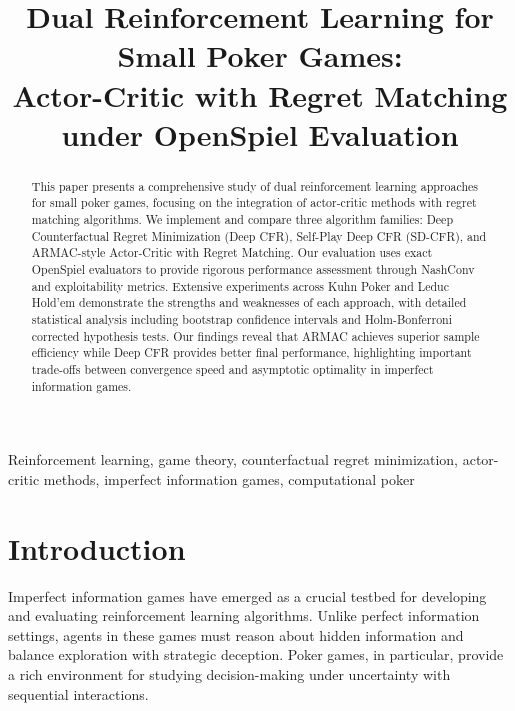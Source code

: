\documentclass[10pt,twocolumn,conference]{IEEEtran}
\begin{document}
\title{Dual Reinforcement Learning for Small Poker Games: \\
Actor-Critic with Regret Matching under OpenSpiel Evaluation}

\author{
}

\maketitle

\begin{abstract}
This paper presents a comprehensive study of dual reinforcement learning approaches for small poker games, focusing on the integration of actor-critic methods with regret matching algorithms. We implement and compare three algorithm families: Deep Counterfactual Regret Minimization (Deep CFR), Self-Play Deep CFR (SD-CFR), and ARMAC-style Actor-Critic with Regret Matching. Our evaluation uses exact OpenSpiel evaluators to provide rigorous performance assessment through NashConv and exploitability metrics. Extensive experiments across Kuhn Poker and Leduc Hold'em demonstrate the strengths and weaknesses of each approach, with detailed statistical analysis including bootstrap confidence intervals and Holm-Bonferroni corrected hypothesis tests. Our findings reveal that ARMAC achieves superior sample efficiency while Deep CFR provides better final performance, highlighting important trade-offs between convergence speed and asymptotic optimality in imperfect information games.
\end{abstract}

\begin{IEEEkeywords}
Reinforcement learning, game theory, counterfactual regret minimization, actor-critic methods, imperfect information games, computational poker
\end{IEEEkeywords}

\section{Introduction}
\label{sec:introduction}

Imperfect information games have emerged as a crucial testbed for developing and evaluating reinforcement learning algorithms. Unlike perfect information settings, agents in these games must reason about hidden information and balance exploration with strategic deception. Poker games, in particular, provide a rich environment for studying decision-making under uncertainty with sequential interactions.
\end{document}
